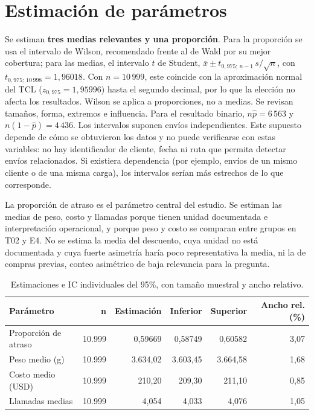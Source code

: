 \documentclass[10pt,a4paper]{article}
\begin{document}
\section{Estimación de parámetros}
Se estiman \textbf{tres medias relevantes y una proporción}. Para la proporción se usa el intervalo de Wilson, recomendado frente al de Wald por su mejor cobertura; para las medias, el intervalo $t$ de Student, $\bar{x}\pm t_{0{,}975;\,n-1}\,s/\sqrt{n}$, con $t_{0{,}975;\,10\,998}=1{,}96018$. Con $n=10\,999$, este coincide con la aproximación normal del TCL ($z_{0{,}975}=1{,}95996$) hasta el segundo decimal, por lo que la elección no afecta los resultados. Wilson se aplica a proporciones, no a medias. Se revisan tamaños, forma, extremos e influencia. Para el resultado binario, $n\hat p=6\,563$ y $n(1-\hat p)=4\,436$. Los intervalos suponen envíos independientes. Este supuesto depende de cómo se obtuvieron los datos y no puede verificarse con estas variables: no hay identificador de cliente, fecha ni ruta que permita detectar envíos relacionados. Si existiera dependencia (por ejemplo, envíos de un mismo cliente o de una misma carga), los intervalos serían más estrechos de lo que corresponde.

La proporción de atraso es el parámetro central del estudio. Se estiman las medias de peso, costo y llamadas porque tienen unidad documentada e interpretación operacional, y porque peso y costo se comparan entre grupos en T02 y E4. No se estima la media del descuento, cuya unidad no está documentada y cuya fuerte asimetría haría poco representativa la media, ni la de compras previas, conteo asimétrico de baja relevancia para la pregunta.

\begin{table}[H]
\centering
\small
\setlength{\tabcolsep}{4pt}
\caption{Estimaciones e IC individuales del 95\%,
con tamaño muestral y ancho relativo.}
\label{tab:ic}

\begin{tabularx}{\linewidth}{@{}Xrrrrr@{}}
\toprule
Parámetro & n & Estimación & Inferior & Superior
& Ancho rel. (\%) \\
\midrule
Proporción de atraso & 10.999 & 0,59669
& 0,58749 & 0,60582 & 3,07 \\

Peso medio (g) & 10.999 & 3.634,02
& 3.603,45 & 3.664,58 & 1,68 \\

Costo medio (USD) & 10.999 & 210,20
& 209,30 & 211,10 & 0,85 \\

Llamadas medias & 10.999 & 4,054
& 4,033 & 4,076 & 1,05 \\
\bottomrule
\end{tabularx}
\end{table}
\end{document}
